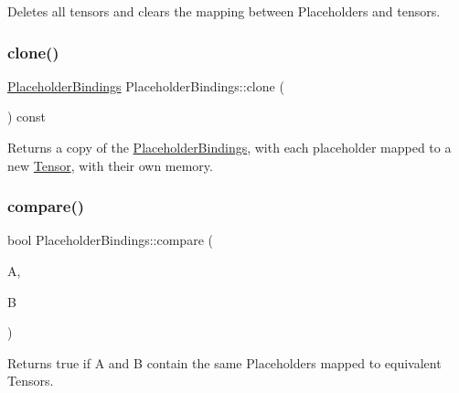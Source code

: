 Deletes all tensors and clears the mapping between Placeholders and tensors. \mbox{\label{classglow_1_1_placeholder_bindings_a9129910138390bf1a3254478500683ab}} 
\subsubsection{\texorpdfstring{clone()}{clone()}}
{\footnotesize\ttfamily \hyperlink{classglow_1_1_placeholder_bindings}{Placeholder\+Bindings} Placeholder\+Bindings\+::clone (\begin{DoxyParamCaption}{ }\end{DoxyParamCaption}) const}

\begin{DoxyReturn}{Returns}
a copy of the \hyperlink{classglow_1_1_placeholder_bindings}{Placeholder\+Bindings}, with each placeholder mapped to a new \hyperlink{classglow_1_1_tensor}{Tensor}, with their own memory. 
\end{DoxyReturn}
\mbox{\label{classglow_1_1_placeholder_bindings_a003d57e22107d779b7de70cd53336c19}} 
\subsubsection{\texorpdfstring{compare()}{compare()}}
{\footnotesize\ttfamily bool Placeholder\+Bindings\+::compare (\begin{DoxyParamCaption}\item[{const \hyperlink{classglow_1_1_placeholder_bindings}{Placeholder\+Bindings} $\ast$}]{A,  }\item[{const \hyperlink{classglow_1_1_placeholder_bindings}{Placeholder\+Bindings} $\ast$}]{B }\end{DoxyParamCaption})\hspace{0.3cm}{\ttfamily [static]}}

\begin{DoxyReturn}{Returns}
true if {\ttfamily A} and {\ttfamily B} contain the same Placeholders mapped to equivalent Tensors. 
\end{DoxyReturn}
\mbox{\label{classglow_1_1_placeholder_bindings_a2c65bd5f6c7bb198e1432d6fc058b2e9}} 
